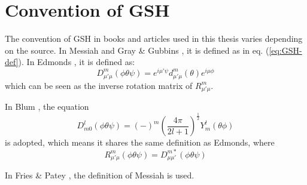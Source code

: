 \section{Convention of GSH\label{sec:Convention-of-GSH}}

The convention of \acs{GSH} in books and articles used in this thesis
varies depending on the source. In Messiah \citep{Messiah} and Gray \& Gubbins \citep{Gray-Gubbins},
it is defined as in eq. (\ref{eq:GSH-def}). In Edmonds \citep{Edmonds},
it is defined as:
\begin{equation}
D_{\mu'\mu}^{m}(\phi\theta\psi)=e^{i\mu'\psi}d_{\mu'\mu}^{m}(\theta)e^{i\mu\phi}\label{eq:GSH-def-1}
\end{equation}
which can be seen as the inverse rotation matrix of $R_{\mu'\mu}^{m}$.

In Blum \citep{Blum_I,Blum_II}, the equation 
\begin{equation}
D_{m0}^{l}(\phi\theta\psi)=\left(-\right)^{m}\left(\dfrac{4\pi}{2l+1}\right)^{\frac{1}{2}}Y_{m}^{l}(\theta\phi)
\end{equation}
is adopted, which means it shares the same definition as Edmonds,
where 
\begin{equation}
R_{\mu'\mu}^{m}(\phi\theta\psi)=D_{\mu\mu'}^{m*}(\phi\theta\psi)\label{eq:GSH-def-2}
\end{equation}

In Fries \& Patey \citep{Fries_Patey_1985}, the definition of Messiah
is used.
